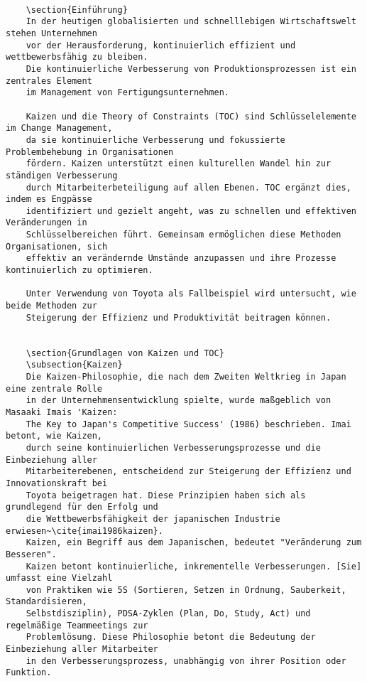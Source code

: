 \begin{verbatim}
	
	\section{Einführung}
	In der heutigen globalisierten und schnelllebigen Wirtschaftswelt stehen Unternehmen
	vor der Herausforderung, kontinuierlich effizient und wettbewerbsfähig zu bleiben.
	Die kontinuierliche Verbesserung von Produktionsprozessen ist ein zentrales Element
	im Management von Fertigungsunternehmen.
	
	Kaizen und die Theory of Constraints (TOC) sind Schlüsselelemente im Change Management,
	da sie kontinuierliche Verbesserung und fokussierte Problembehebung in Organisationen
	fördern. Kaizen unterstützt einen kulturellen Wandel hin zur ständigen Verbesserung
	durch Mitarbeiterbeteiligung auf allen Ebenen. TOC ergänzt dies, indem es Engpässe
	identifiziert und gezielt angeht, was zu schnellen und effektiven Veränderungen in
	Schlüsselbereichen führt. Gemeinsam ermöglichen diese Methoden Organisationen, sich
	effektiv an verändernde Umstände anzupassen und ihre Prozesse kontinuierlich zu optimieren.
	
	Unter Verwendung von Toyota als Fallbeispiel wird untersucht, wie beide Methoden zur
	Steigerung der Effizienz und Produktivität beitragen können.
	
	
	\section{Grundlagen von Kaizen und TOC}
	\subsection{Kaizen}
	Die Kaizen-Philosophie, die nach dem Zweiten Weltkrieg in Japan eine zentrale Rolle
	in der Unternehmensentwicklung spielte, wurde maßgeblich von Masaaki Imais 'Kaizen:
	The Key to Japan's Competitive Success' (1986) beschrieben. Imai betont, wie Kaizen,
	durch seine kontinuierlichen Verbesserungsprozesse und die Einbeziehung aller
	Mitarbeiterebenen, entscheidend zur Steigerung der Effizienz und Innovationskraft bei
	Toyota beigetragen hat. Diese Prinzipien haben sich als grundlegend für den Erfolg und
	die Wettbewerbsfähigkeit der japanischen Industrie erwiesen~\cite{imai1986kaizen}.
	Kaizen, ein Begriff aus dem Japanischen, bedeutet "Veränderung zum Besseren".
	Kaizen betont kontinuierliche, inkrementelle Verbesserungen. [Sie] umfasst eine Vielzahl
	von Praktiken wie 5S (Sortieren, Setzen in Ordnung, Sauberkeit, Standardisieren,
	Selbstdisziplin), PDSA-Zyklen (Plan, Do, Study, Act) und regelmäßige Teammeetings zur 
	Problemlösung. Diese Philosophie betont die Bedeutung der Einbeziehung aller Mitarbeiter
	in den Verbesserungsprozess, unabhängig von ihrer Position oder Funktion.
	

\end{verbatim}
